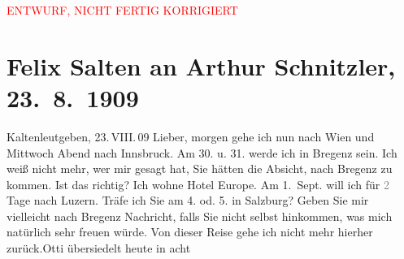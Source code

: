 
\begin{center}
            \textcolor{red}{ENTWURF, NICHT FERTIG KORRIGIERT}
                      \end{center}
            
         
         \renewcommand{\erwaehntePersonen}{Personen: Anna Katharina Rehmann, Ottilie Salten, Paul Salten, Heinrich Schnitzler, Lili Schnitzler, Olga Schnitzler}
         \renewcommand{\erwaehnteOrte}{Orte: Bregenz, Gütsch, Hotel de l’Europe, Innsbruck, Kaltenleutgeben, Salzburg, Wien}
         \renewcommand{\erwaehnteWerke}{}
               \section[Felix Salten an Arthur Schnitzler, 23. 8. 1909]{ Felix Salten an Arthur Schnitzler, 23. 8. 1909}\nopagebreak{}\rehead{ }\begin{ledgroupsized}[t]{13cm}\normalsize\beginnumbering \toendnotes[C]{\smallbreak\pagebreak[2]} 
\toendnotes[C]{\smallbreak}\pstart
           \raggedleft{}{\pb}Kaltenleutgeben, 23. VIII. 09\pend
           \pstart
           Lieber, morgen gehe ich nun nach Wien und Mittwoch Abend nach Innsbruck.
               Am 30. u. 31. werde ich in Bregenz sein. Ich weiß nicht mehr, wer mir gesagt hat, Sie hätten die
               Absicht, nach Bregenz zu kommen. Ist das
               richtig? Ich wohne Hotel Europe. Am 1. Sept.
               will ich für \textcolor{gray}{2} Tage nach Luzern. Träfe ich Sie am 4. od. 5. in Salzburg? Geben Sie mir vielleicht nach Bregenz Nachricht, falls Sie nicht selbst
               hinkommen, was mich natürlich sehr freuen würde. Von dieser Reise gehe ich nicht mehr
               hierher zurück.Otti übersiedelt heute in acht

\end{ledgroupsized}
